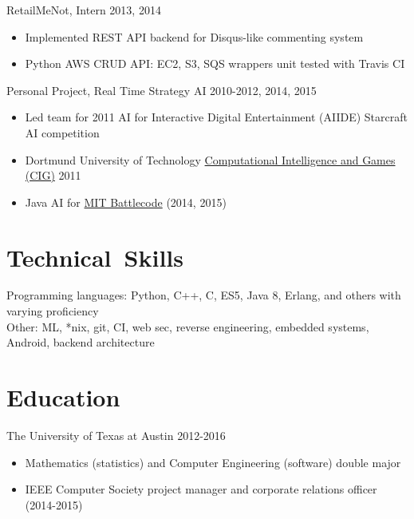 \documentclass[line,margin]{res}
\begin{document}
\begin{resume}
    \vspace{-8pt}
    RetailMeNot, Intern
    \hfill  2013, 2014
        \begin{itemize} \itemsep -2pt
        \item Implemented REST API backend for Disqus-like commenting system
        \item Python AWS CRUD API: EC2, S3, SQS wrappers unit tested with Travis CI
        \end{itemize}

    \vspace{-8pt}
    Personal Project, Real Time Strategy AI 
    \hfill  2010-2012, 2014, 2015
        \begin{itemize} \itemsep -2pt
        \item Led team for 2011 AI for Interactive Digital Entertainment (AIIDE) Starcraft AI competition  
        \item Dortmund University of Technology \href{http://ls11-www.cs.tu-dortmund.de/rts-competition/starcraft-cig2011}{Computational Intelligence and Games (CIG)} 2011
        \item Java AI for \href{http://www.battlecode.org/}{MIT Battlecode} (2014, 2015)
        \end{itemize}


\vspace{-8pt}
\section{\mbox{Technical Skills}}
    \vspace{12pt} 
    Programming languages: Python, C++, C, ES5, Java 8, Erlang, and others with varying proficiency\\ 
    Other: ML, *nix, git, CI, web sec, reverse engineering, embedded systems, Android, backend architecture


\vspace{-8pt}
\section{Education} 
    \vspace{12pt}
    The University of Texas at Austin \hfill 2012-2016 \\
    \vspace{-12pt}
        \begin{itemize} \itemsep -2pt
        \item Mathematics (statistics) and Computer Engineering (software) double major
        \item IEEE Computer Society project manager and corporate relations officer (2014-2015)
        \end{itemize}
     

\end{resume}
\end{document}
